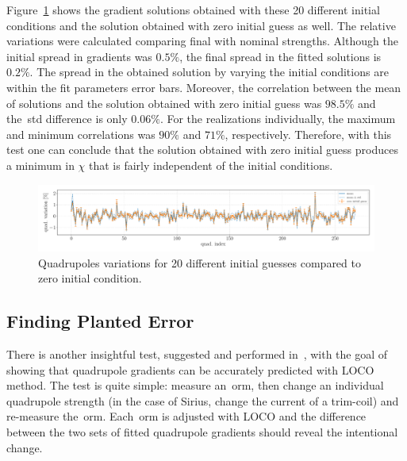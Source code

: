 Figure~\ref{fig:quad_stren_ini_guess} shows the gradient solutions obtained with these 20 different initial conditions and the solution obtained with zero initial guess as well. The relative variations were calculated comparing final with nominal strengths. Although the initial spread in gradients was $0.5\%$, the final spread in the fitted solutions is $0.2\%$. The spread in the obtained solution by varying the initial conditions are within the fit parameters error bars. Moreover, the correlation between the mean of solutions and the solution obtained with zero initial guess was $98.5\%$ and the~\gls{std} difference is only $0.06\%$. For the realizations individually, the maximum and minimum correlations was $90\%$ and $71\%$, respectively. Therefore, with this test one can conclude that the solution obtained with zero initial guess produces a minimum in $\chi$ that is fairly independent of the initial conditions.
\begin{figure}
\centering
\includegraphics[width=1.0\textwidth]{figures/quad_stren_initial_guess.pdf}
\caption{Quadrupoles variations for 20 different initial guesses compared to zero initial condition.}
\label{fig:quad_stren_ini_guess}
\end{figure}
\subsection{Finding Planted Error}
There is another insightful test, suggested and performed in~\cite{safranek1995}, with the goal of showing that quadrupole gradients can be accurately predicted with LOCO method. The test is quite simple: measure an~\gls{orm}, then change an individual quadrupole strength (in the case of Sirius, change the current of a trim-coil) and re-measure the~\gls{orm}. Each~\gls{orm} is adjusted with LOCO and the difference between the two sets of fitted quadrupole gradients should reveal the intentional change.

